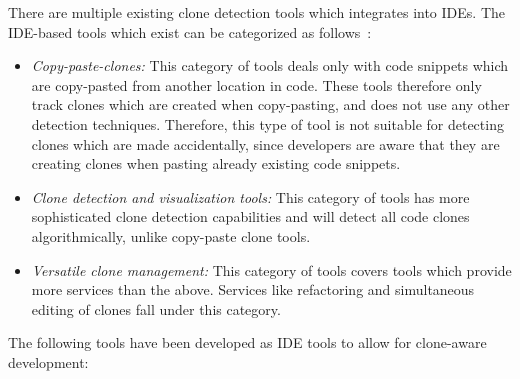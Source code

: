 There are multiple existing clone detection tools which integrates into IDEs. The
IDE-based tools which exist can be categorized as
follows~\cite[8]{Udding_Towards_Convenient_Management}:

\begin{itemize}
	\item\textit{Copy-paste-clones:} This category of tools deals only with code snippets which are
	copy-pasted from another location in code. These tools therefore only track clones which
	are created when copy-pasting, and does not use any other detection techniques. Therefore,
	this type of tool is not suitable for detecting clones which are made accidentally, since
	developers are aware that they are creating clones when pasting already existing code
	snippets.

    \item\textit{Clone detection and visualization tools:} This category of tools has more
        sophisticated clone detection capabilities and will detect all code clones
        algorithmically, unlike copy-paste clone tools.

    \item\textit{Versatile clone management:} This category of tools covers tools which
        provide more services than the above. Services like refactoring and simultaneous
        editing of clones fall under this category.

\end{itemize}

The following tools have been developed as IDE tools to allow for clone-aware development:

